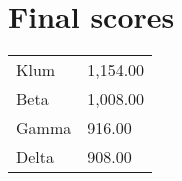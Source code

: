 \documentclass{article}
\begin{document}
\section*{Final scores}

\begin{center}
\begin{tabular}[t]{ll}
Klum & 1,154.00\\
Beta & 1,008.00\\
Gamma & 916.00\\
Delta & 908.00\\
\end{tabular}
\end{center}
\end{document}
